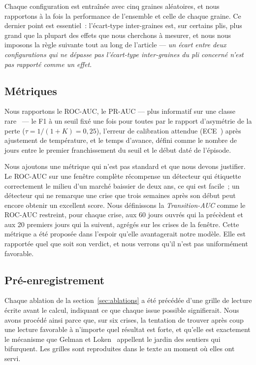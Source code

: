 \documentclass[11pt,a4paper]{article}
\begin{document}
Chaque configuration est entraînée avec cinq graines aléatoires, et nous rapportons à la fois la performance de l'ensemble et celle de chaque graine. Ce dernier point est essentiel~: l'écart-type inter-graines est, sur certains plis, plus grand que la plupart des effets que nous cherchons à mesurer, et nous nous imposons la règle suivante tout au long de l'article --- \emph{un écart entre deux configurations qui ne dépasse pas l'écart-type inter-graines du pli concerné n'est pas rapporté comme un effet}.

\subsection{Métriques}

Nous rapportons le ROC-AUC, le PR-AUC --- plus informatif sur une classe rare~\cite{saito2015} --- le F1 à un seuil fixé une fois pour toutes par le rapport d'asymétrie de la perte ($\tau = 1/(1+K) = 0{,}25$), l'erreur de calibration attendue (ECE~\cite{guo2017}) après ajustement de température, et le temps d'avance, défini comme le nombre de jours entre le premier franchissement du seuil et le début daté de l'épisode.

Nous ajoutons une métrique qui n'est pas standard et que nous devons justifier. Le ROC-AUC sur une fenêtre complète récompense un détecteur qui étiquette correctement le milieu d'un marché baissier de deux ans, ce qui est facile~; un détecteur qui ne remarque une crise que trois semaines après son début peut encore obtenir un excellent score. Nous définissons la \emph{Transition-AUC} comme le ROC-AUC restreint, pour chaque crise, aux 60 jours ouvrés qui la précèdent et aux 20 premiers jours qui la suivent, agrégés sur les crises de la fenêtre. Cette métrique a été proposée dans l'espoir qu'elle avantagerait notre modèle. Elle est rapportée quel que soit son verdict, et nous verrons qu'il n'est pas uniformément favorable.

\subsection{Pré-enregistrement}

Chaque ablation de la section~\ref{sec:ablations} a été précédée d'une grille de lecture écrite avant le calcul, indiquant ce que chaque issue possible signifierait. Nous avons procédé ainsi parce que, sur six crises, la tentation de trouver après coup une lecture favorable à n'importe quel résultat est forte, et qu'elle est exactement le mécanisme que Gelman et Loken~\cite{gelman2013} appellent le jardin des sentiers qui bifurquent. Les grilles sont reproduites dans le texte au moment où elles ont servi.
\end{document}
